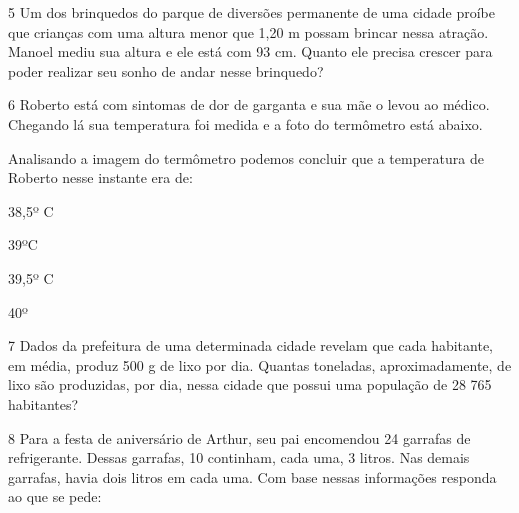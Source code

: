 
\num{5} Um dos brinquedos do parque de diversões permanente de uma cidade
proíbe que crianças com uma altura menor que 1,20 m possam brincar nessa
atração. Manoel mediu sua altura e ele está com 93 cm. Quanto ele
precisa crescer para poder realizar seu sonho de andar nesse brinquedo?



\num{6} Roberto está com sintomas de dor de garganta e sua mãe o levou ao
médico. Chegando lá sua temperatura foi medida e a foto do termômetro
está abaixo.


Analisando a imagem do termômetro podemos concluir que a temperatura de
Roberto nesse instante era de:

\begin{escolha}
\item
  38,5º C
\item
  39ºC
\item
  39,5º C
\item
  40º
\end{escolha}


\num{7} Dados da prefeitura de uma determinada cidade revelam que cada
habitante, em média, produz 500 g de lixo por dia. Quantas toneladas,
aproximadamente, de lixo são produzidas, por dia, nessa cidade que
possui uma população de 28 765 habitantes?



\num{8} Para a festa de aniversário de Arthur, seu pai encomendou 24
garrafas de refrigerante. Dessas garrafas, 10 continham, cada uma, 3
litros. Nas demais garrafas, havia dois litros em cada uma. Com base
nessas informações responda ao que se pede:

